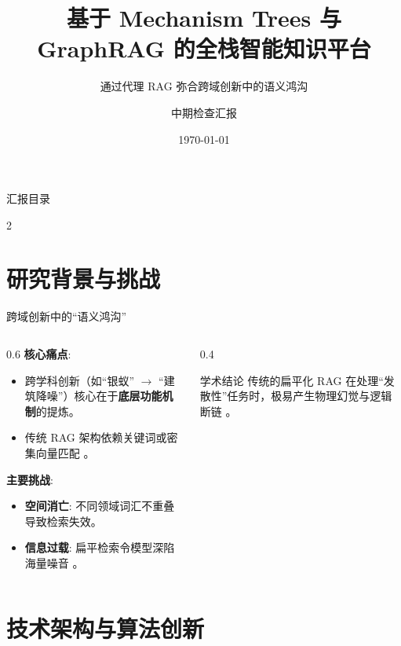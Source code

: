 \documentclass[aspectratio=169, 11pt]{ctexbeamer}
\title[全栈智能知识平台]{基于 Mechanism Trees 与 GraphRAG 的全栈智能知识平台}
\subtitle{通过代理 RAG 弥合跨域创新中的语义鸿沟}
\author{中期检查汇报}
\institute{C404 研发团队}
\date{\today}
\begin{document}
\begin{frame}
    \titlepage
\end{frame}

\begin{frame}{汇报目录}
    \begin{multicols}{2}
        \tableofcontents
    \end{multicols}
\end{frame}

\section{研究背景与挑战}

\begin{frame}{跨域创新中的“语义鸿沟”}
    \begin{columns}
        \begin{column}{0.6\textwidth}
            \textbf{核心痛点}:
            \begin{itemize}
                \item 跨学科创新（如“银蚁” $\rightarrow$ “建筑降噪”）核心在于\textbf{底层功能机制}的提炼。
                \item 传统 RAG 架构依赖关键词或密集向量匹配 \cite{microsoft2024graphrag}。
            \end{itemize}
            \vspace{0.3cm}
            \textbf{主要挑战}:
            \begin{itemize}
                \item \textbf{空间消亡}: 不同领域词汇不重叠导致检索失效。
                \item \textbf{信息过载}: 扁平检索令模型深陷海量噪音 \cite{yang2025overload}。
            \end{itemize}
        \end{column}
        \begin{column}{0.4\textwidth}
            \begin{exampleblock}{学术结论}
                \small 传统的扁平化 RAG 在处理“发散性”任务时，极易产生物理幻觉与逻辑断链 \cite{han2025rag_vs_graphrag}。
            \end{exampleblock}
        \end{column}
    \end{columns}
\end{frame}

\section{技术架构与算法创新}
\end{document}
